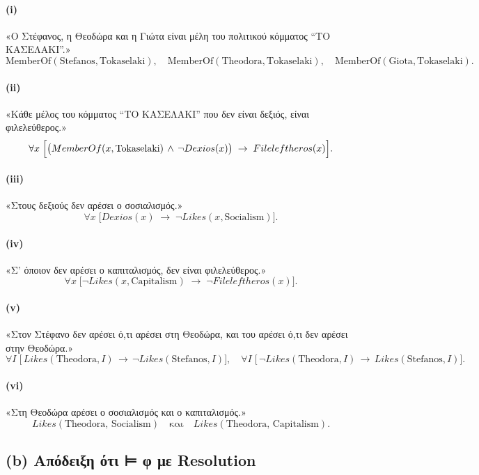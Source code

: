 \documentclass[a4paper,12pt]{article}
\begin{document}
\paragraph{(i)}
«Ο Στέφανος, η Θεοδώρα και η Γιώτα είναι μέλη του πολιτικού κόμματος “ΤΟ ΚΑΣΕΛΑΚΙ”.»
\[
\text{MemberOf}(\text{Stefanos}, \text{Tokaselaki}),\quad \text{MemberOf}(\text{Theodora}, \text{Tokaselaki}),\quad \text{MemberOf}(\text{Giota}, \text{Tokaselaki}).
\]

\paragraph{(ii)}
«Κάθε μέλος του κόμματος “ΤΟ ΚΑΣΕΛΑΚΙ” που δεν είναι δεξιός, είναι φιλελεύθερος.»
\[
\forall x\;\Bigl[\bigl(MemberOf(x, \text{Tokaselaki})\,\wedge\,\neg Dexios(x)\bigr)\;\to\;Fileleftheros(x)\Bigr].
\]

\paragraph{(iii)}
«Στους δεξιούς δεν αρέσει ο σοσιαλισμός.»
\[
\forall x\;\bigl[ Dexios(x)\;\to\;\neg Likes(x, \text{Socialism})\bigr].
\]

\paragraph{(iv)}
«Σ’ όποιον δεν αρέσει ο καπιταλισμός, δεν είναι φιλελεύθερος.»
\[
\forall x\;\bigl[\neg Likes(x, \text{Capitalism})\;\to\;\neg Fileleftheros(x)\bigr].
\]

\paragraph{(v)}
«Στον Στέφανο δεν αρέσει ό,τι αρέσει στη Θεοδώρα, και του αρέσει ό,τι δεν αρέσει στην Θεοδώρα.»
\[
\forall I\;\bigl[\,Likes(\text{Theodora},I)\,\to\,\neg Likes(\text{Stefanos},I)\bigr], \quad
\forall I\;\bigl[\,\neg Likes(\text{Theodora},I)\,\to\,Likes(\text{Stefanos},I)\bigr].
\]

\paragraph{(vi)}
«Στη Θεοδώρα αρέσει ο σοσιαλισμός και ο καπιταλισμός.»
\[
Likes(\text{Theodora},\,\text{Socialism})\quad\text{και}\quad Likes(\text{Theodora},\,\text{Capitalism}).
\]

\subsection*{(b) Απόδειξη ότι  ⊨ φ με Resolution}
\end{document}
